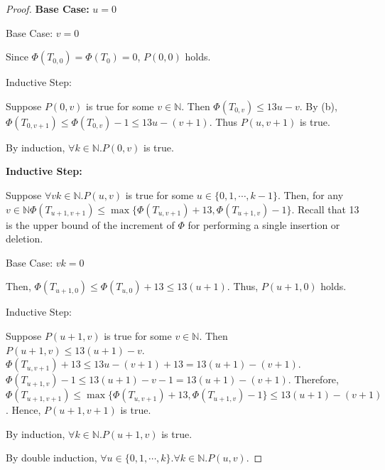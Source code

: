 \documentclass[10pt]{article}
\begin{document}
\begin{enumerate}
\begin{enumerate}
\begin{proof}
					\textbf{Base Case:} $u = 0$
					\begin{addmargin}[1em]{0em}
						Base Case: $v = 0$
						\begin{addmargin}[1em]{0em}
							Since $\Phi(T_{0, 0}) = \Phi(T_0) = 0$, $P(0,0)$
							holds.
						\end{addmargin}
						
						Inductive Step:
						\begin{addmargin}[1em]{0em}
							Suppose $P(0, v)$ is true for some $v \in
							\mathbb{N}$.
							Then $\Phi(T_{0, v}) \leq 13u-v$.
							By (b), $\Phi(T_{0,v+1}) \leq \Phi(T_{0, v}) - 1
							\leq 13u-(v+1)$.
							Thus $P(u, v+1)$ is true.
						\end{addmargin}

						By induction, $\forall k \in \mathbb{N}. P(0, v)$ is
						true.
					\end{addmargin}

					\textbf{Inductive Step:}
					\begin{addmargin}[1em]{0em}
						Suppose $\forall vk \in \mathbb{N}. P(u,v)$ is true for
						some $u \in \{0, 1, \cdots, k-1\}$.
						Then, for any $v \in \mathbb{N} \Phi(T_{u+1, v+1}) \leq
						\max\{\Phi(T_{u,v+1})+13, \Phi(T_{u+1,v})-1\}$.
						Recall that 13 is the upper bound of the increment of
						$\Phi$ for performing a single insertion or deletion.

						Base Case: $vk = 0$
						\begin{addmargin}[1em]{0em}
							Then, $\Phi(T_{u+1,0}) \leq \Phi(T_{u, 0})+13 \leq
							13(u+1)$.
							Thus, $P(u+1,0)$ holds.
						\end{addmargin}

						Inductive Step:
						\begin{addmargin}[1em]{0em}
							Suppose $P(u+1, v)$ is true for some $v \in
							\mathbb{N}$.
							Then $P(u+1, v) \leq 13(u+1)-v$.
							$\Phi(T_{u,v+1})+13 \leq 13u-(v+1)+13 =
							13(u+1)-(v+1)$.
							$\Phi(T_{u+1,v})-1 \leq 13(u+1)-v-1 =
							13(u+1)-(v+1)$.
							Therefore, $\Phi(T_{u+1, v+1}) \leq
							\max\{\Phi(T_{u,v+1})+13, \Phi(T_{u+1,v})-1\} \leq
							13(u+1)-(v+1)$.
							Hence, $P(u+1,v+1)$ is true.
						\end{addmargin}

						By induction, $\forall k \in \mathbb{N}. P(u+1, v)$ is
						true.

					\end{addmargin}

					By double induction, $\forall u \in \{0, 1, \cdots, k\}.
					\forall k \in \mathbb{N}. P(u, v)$.


\end{proof}
\end{enumerate}
\end{enumerate}
\end{document}
